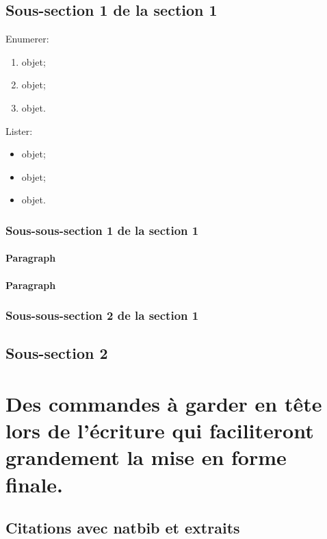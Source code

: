 \subsection{Sous-section 1 de la section 1}

Enumerer:
\begin{enumerate}
\item objet;
\item objet;
\item objet.
\end{enumerate}

Lister:
\begin{itemize}
\item objet;
\item objet;
\item objet.
\end{itemize}

\subsubsection{Sous-sous-section 1 de la section 1}

\paragraph{Paragraph}

\paragraph{Paragraph}

\subsubsection{Sous-sous-section 2 de la section 1}

\subsection{Sous-section 2}

\section[Des commandes dans le corps du texte]{Des commandes à garder en tête lors de l'écriture qui faciliteront grandement la mise en forme finale.
}\label{sec:12}

\subsection{Citations avec natbib et extraits}

